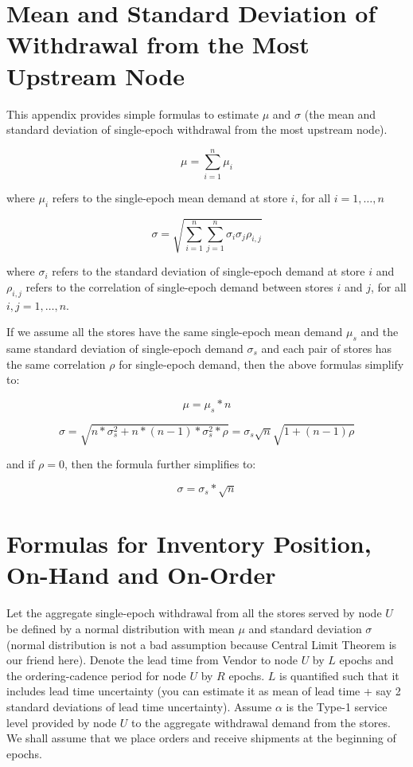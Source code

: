 \documentclass[11pt]{amsart}
\begin{document}
\begin{appendices}

\section{Mean and Standard Deviation of Withdrawal from the Most Upstream Node}
\label{appendix:MeanStdevFormulas}

This appendix provides simple formulas to estimate $\mu$ and $\sigma$ (the mean and standard deviation of single-epoch withdrawal from the most upstream node). 

$$\mu = \sum_{i=1}^n \mu_i$$

where $\mu_i$ refers to the single-epoch mean demand at store $i$, for all $i = 1, \ldots, n$

$$\sigma = \sqrt{\sum_{i=1}^n \sum_{j=1}^n \sigma_i \sigma_j \rho_{i,j} }$$

where $\sigma_i$ refers to the standard deviation of single-epoch demand at store $i$ and $\rho_{i,j}$ refers to the correlation of single-epoch demand between stores $i$ and $j$, for all $i, j = 1, \ldots, n$.

If we assume all the stores have the same single-epoch mean demand $\mu_s$ and the same standard deviation of single-epoch demand $\sigma_s$ and each pair of stores has the same correlation $\rho$ for single-epoch demand, then the above formulas simplify to:

$$\mu = \mu_s * n$$

$$\sigma = \sqrt{ n * \sigma_s^2 + n * (n-1) * \sigma_s^2 * \rho} = \sigma_s \sqrt{n} \sqrt{1 + (n-1) \rho}$$

and if $\rho = 0$, then the formula further simplifies to:

$$\sigma = \sigma_s * \sqrt{n}$$

\section{Formulas for Inventory Position, On-Hand and On-Order}
\label{appendix:IPOHOOFormulas}

Let the aggregate single-epoch withdrawal from all the stores served by node $U$ be defined by a normal distribution with mean $\mu$ and standard deviation $\sigma$ (normal distribution is not a bad assumption because Central Limit Theorem is our friend here). Denote the lead time from Vendor to node $U$ by $L$ epochs and the ordering-cadence period for node $U$ by $R$ epochs. $L$ is quantified such that it includes lead time uncertainty (you can estimate it as mean of lead time + say 2 standard deviations of lead time uncertainty). Assume $\alpha$ is the Type-1 service level provided by node $U$ to the aggregate withdrawal demand from the stores. We shall assume that we place orders and receive shipments at the beginning of epochs.


\end{appendices}
\end{document}
